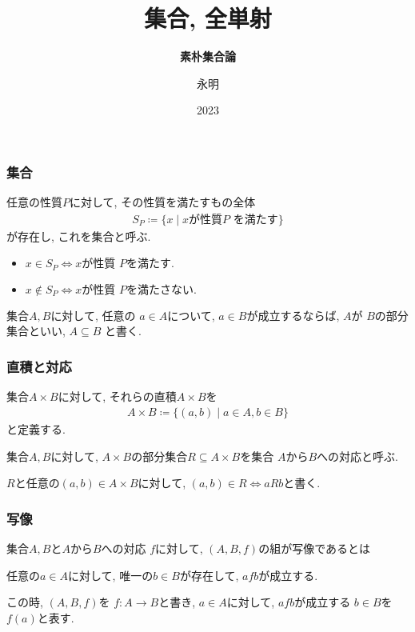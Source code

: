 \documentclass[unicode,12pt]{beamer}%
\title{集合, 全単射}
\subtitle{\fontsize{9pt}{14pt}\textbf{素朴集合論}}
\author{永明}
\institute{数学部会}
\date{2023}
\begin{document}
\begin{frame}
 \titlepage 
\end{frame}
\begin{frame}
  \frametitle{集合}
  任意の性質$P$に対して, その性質を満たすもの全体
   \begin{equation}
    \begin{aligned}
      S_P \coloneqq \{x  \mid \text{$x$が性質$P$ を満たす}\} 
    \end{aligned}
  \end{equation} 
  が存在し, これを集合と呼ぶ. 

  \begin{itemize}
    \item $x \in S_P \iff \text{$x$が性質 $P$を満たす.}$
    \item $x \not\in S_P \iff \text{$x$が性質 $P$を満たさない. }$
  \end{itemize}
  集合$A,B$に対して, 任意の $a \in A$について, $a \in B$が成立するならば, 
  $A$が $B$の部分集合といい, $A \subseteq B$ と書く. 
\end{frame}

\begin{frame}
  \frametitle{直積と対応}

  集合$A \times B$に対して, それらの直積$A \times B$を
  \begin{equation}
    \begin{aligned}
      A \times B \coloneqq \{(a,b)  \mid a \in A, b \in B\} 
    \end{aligned}
  \end{equation}
  と定義する. 

  集合$A,B$に対して,  $A \times B$の部分集合$R \subseteq A \times B$を集合 $A$から$B$への対応と呼ぶ.  
 

  $R$と任意の$(a,b) \in A \times B$に対して, $(a,b) \in R \iff a R b$と書く. 
\end{frame}

\begin{frame}
  \frametitle{写像}
  集合$A,B$と$A$から$B$への対応 $f$に対して, $(A,B,f)$の組が写像であるとは

  任意の$a \in A$に対して, 唯一の$b \in B$が存在して, $a f b$が成立する. 

  この時,  $(A,B,f)$を $f :A \to B$と書き, $a \in A$に対して, $a f b$が成立する
   $b \in B$を$f(a)$と表す. 

   


\end{frame}
\end{document}
